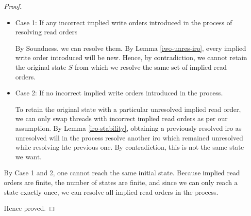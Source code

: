         \begin{proof}

            \begin{itemize}
                \item Case 1: If any incorrect implied write orders introduced in the process of resolving read orders 

                    By Soundness, we can resolve them. 
                    By Lemma \ref{iwo-unres-iro}, every implied write order introduced will be new.
                    Hence, by contradiction, we cannot retain the original state $S$ from which we resolve the same set of implied read orders. 

                \item Case 2: If no incorrect implied write orders introduced in the process.

                    To retain the original state with a particular unresolved implied read order, we can only swap threads with incorrect implied read orders as per our assumption. 
                    By Lemma \ref{iro-stability}, obtaining a previously resolved iro as unresolved will in the process resolve another iro which remained unresolved while resolving hte previous one.
                    By contradiction, this is not the same state we want. \
            \end{itemize}

            By Case 1 and 2, one cannot reach the same initial state.
            Because implied read orders are finite, the number of states are finite, and since we can only reach a state exactly once, 
            we can resolve all implied read orders in the process. 

            Hence proved.

        \end{proof}

